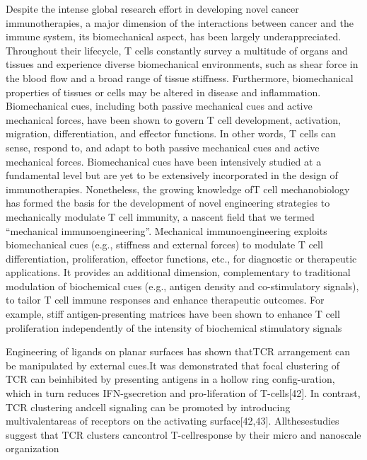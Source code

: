 Despite the intense global research effort in developing novel cancer immunotherapies, a major dimension of the interactions between cancer and the immune system, its biomechanical aspect, has been largely underappreciated. Throughout their lifecycle, T cells constantly survey a multitude of organs and tissues and experience diverse biomechanical environments, such as shear force in the blood flow and a broad range of tissue stiffness. Furthermore, biomechanical properties of tissues or cells may be altered in disease and inflammation. Biomechanical cues, including both passive mechanical cues and active mechanical forces, have been shown to govern T cell development, activation, migration, differentiation, and effector functions. In other words, T cells can sense, respond to, and adapt to both passive mechanical cues and active mechanical forces. Biomechanical cues have been intensively studied at a fundamental level but are yet to be extensively incorporated in the design of immunotherapies. Nonetheless, the growing knowledge ofT cell mechanobiology has formed the basis for the development of novel engineering strategies to mechanically modulate T cell immunity, a nascent field that we termed “mechanical immunoengineering”. Mechanical immunoengineering exploits biomechanical cues (e.g., stiffness and external forces) to modulate T cell differentiation, proliferation, effector functions, etc., for diagnostic or therapeutic applications. It provides an additional dimension, complementary to traditional modulation of biochemical cues (e.g., antigen density and co-stimulatory signals), to tailor T cell immune responses and enhance therapeutic outcomes. For example, stiff antigen-presenting matrices have been shown to enhance T cell proliferation independently of the intensity of biochemical stimulatory signals \cite{Lei2020}

Engineering of ligands on planar surfaces has shown thatTCR arrangement can be manipulated by external cues.It was demonstrated that focal clustering of TCR can beinhibited by presenting antigens in a hollow ring config-uration, which in turn reduces IFN-gsecretion and pro-liferation of T-cells[42]. In contrast, TCR clustering andcell signaling can be promoted by introducing multivalentareas of receptors on the activating surface[42,43]. Allthesestudies suggest that TCR clusters cancontrol T-cellresponse by their micro and nanoscale organization \cite{Aramesh2019}

